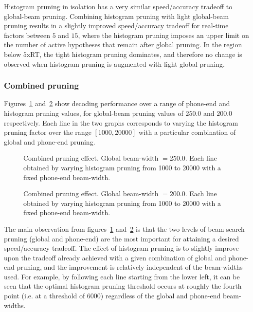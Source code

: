 \documentclass[a4paper,12pt]{report}
\begin{document}
Histogram pruning in isolation has a very similar speed/accuracy tradeoff to global-beam pruning. Combining histogram pruning with light global-beam pruning results in a slightly improved speed/accuracy tradeoff for real-time factors between $5$ and $15$, where the histogram pruning imposes an upper limit on the number of active hypotheses that remain after global pruning. In the region below $5$xRT, the tight histogram pruning dominates, and therefore no change is observed when histogram pruning is augmented with light global pruning.


\subsubsection{Combined pruning}

Figures~\ref{fig:main250graph} and~\ref{fig:main200graph} show decoding performance over a range of phone-end and histogram pruning values, for global-beam pruning values of $250.0$ and $200.0$ respectively. Each line in the two graphs corresponds to varying the histogram pruning factor over the range $[1000,20000]$ with a particular combination of global and phone-end pruning.

\begin{figure}
\begin{center}
\caption{Combined pruning effect. Global beam-width $=250.0$. Each line obtained by varying histogram pruning from 1000 to 20000 with a fixed phone-end beam-width.}
\label{fig:main250graph}
\end{center}
\end{figure}

\begin{figure}
\begin{center}
\caption{Combined pruning effect. Global beam-width $=200.0$. Each line obtained by varying histogram pruning from 1000 to 20000 with a fixed phone-end beam-width.}
\label{fig:main200graph}
\end{center}
\end{figure}

The main observation from figures~\ref{fig:main250graph} and~\ref{fig:main200graph} is that the two levels of beam search pruning (global and phone-end) are the most important for attaining a desired speed/accuracy tradeoff. The effect of histogram pruning is to slightly improve upon the tradeoff already achieved with a given combination of global and phone-end pruning, and the improvement is relatively independent of the beam-widths used. For example, by following each line starting from the lower left, it can be seen that the optimal histogram pruning threshold occurs at roughly the fourth point (i.e. at a threshold of $6000$) regardless of the global and phone-end beam-widths.
\end{document}
